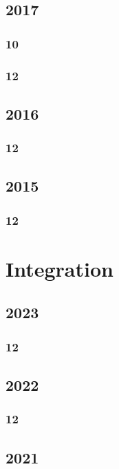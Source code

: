 \documentclass[11pt]{book}
\begin{document}
\section{2017}
\subsection{10}

\subsection{12}


\section{2016}
\subsection{12}


\section{2015}
\subsection{12}









\chapter{Integration}
\section{2023}
\subsection{12}

\section{2022}
\subsection{12}


\section{2021}
\end{document}
